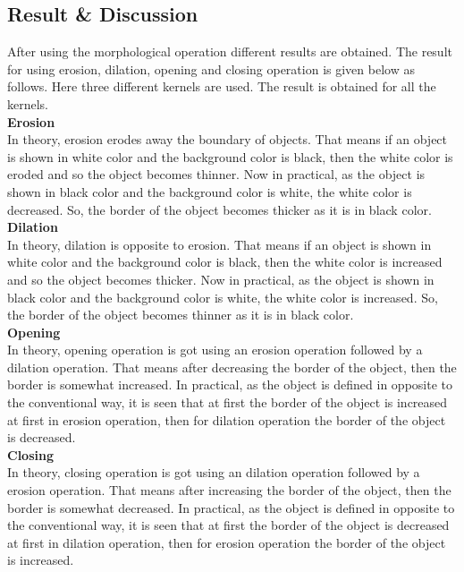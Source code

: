 \documentclass{article}
\begin{document}
{    \subsection{Result & Discussion}{
        After using the morphological operation different results are obtained. The result for using erosion, dilation, opening and closing operation is given below as follows. Here three different kernels are used. The result is obtained for all the kernels.\\
        \textbf{Erosion}\\
        In theory, erosion erodes away the boundary of objects. That means if an object is shown in white color and the background color is black, then the white color is eroded and so the object becomes thinner. Now in practical, as the object is shown in black color and the background color is white, the white color is decreased. So, the border of the object becomes thicker as it is in black color.\\
        \textbf{Dilation}\\
        In theory, dilation is opposite to erosion. That means if an object is shown in white color and the background color is black, then the white color is increased and so the object becomes thicker. Now in practical, as the object is shown in black color and the background color is white, the white color is increased. So, the border of the object becomes thinner as it is in black color.\\
        \textbf{Opening}\\
        In theory, opening operation is got using an erosion operation followed by a dilation operation. That means after decreasing the border of the object, then the border is somewhat increased. In practical, as the object is defined in opposite to the conventional way, it is seen that at first the border of the object is increased at first in erosion operation, then for dilation operation the border of the object is decreased.\\
        \textbf{Closing}\\
        In theory, closing operation is got using an dilation operation followed by a erosion operation. That means after increasing the border of the object, then the border is somewhat decreased. In practical, as the object is defined in opposite to the conventional way, it is seen that at first the border of the object is decreased at first in dilation operation, then for erosion operation the border of the object is increased.\\
        
}}
\end{document}

